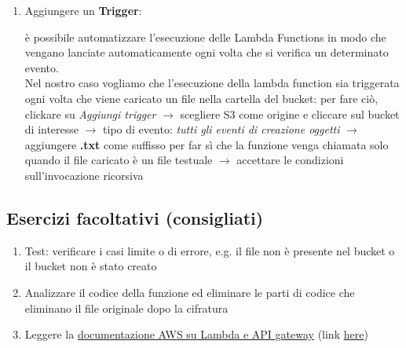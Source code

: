 \begin{enumerate}
    \item Aggiungere un \textbf{Trigger}:
    
    è possibile automatizzare l'esecuzione delle Lambda Functions in modo che vengano lanciate automaticamente ogni volta che si verifica un determinato evento.\\
    Nel nostro caso vogliamo che l'esecuzione della lambda function sia triggerata ogni volta che viene caricato un file nella cartella  del bucket: per fare ciò, clickare su \textit{Aggiungi trigger} $\rightarrow$ scegliere S3 come origine e cliccare sul bucket di interesse $\rightarrow$ tipo di evento: \textit{tutti gli eventi di creazione oggetti} $\rightarrow$ aggiungere \textbf{.txt} come suffisso per far sì che la funzione venga chiamata solo quando il file caricato è un file testuale $\rightarrow$ accettare le condizioni sull'invocazione ricorsiva
    
\end{enumerate}

\subsection{Esercizi facoltativi (consigliati)}
\begin{enumerate}
    \item Test: verificare i casi limite o di errore, e.g. il file non è presente nel bucket o il bucket non è stato creato

    \item Analizzare il codice della funzione ed eliminare le parti di codice che eliminano il file originale dopo la cifratura

    \item Leggere la \href{https://docs.aws.amazon.com/it_it/lambda/latest/dg/services-apigateway- tutorial.html}{documentazione AWS su Lambda e API gateway} (link \href{https://docs.aws.amazon.com/it_it/lambda/latest/dg/services-apigateway- tutorial.html}{here})
\end{enumerate}